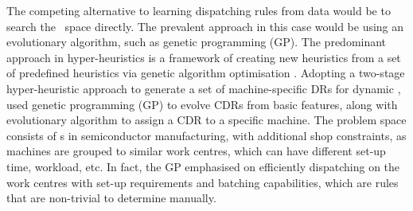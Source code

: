 \documentclass[twocolumn]{svjour3}
\begin{document}
The competing alternative to learning dispatching rules from data would be to 
search the \dr\ space directly. The prevalent approach in this case would be 
using an evolutionary algorithm, such as genetic programming (GP). 
%
The predominant approach in hyper-heuristics is a framework of creating 
new heuristics from a set of predefined heuristics via genetic algorithm 
optimisation \cite{Burke10}. 
Adopting a two-stage hyper-heuristic approach to generate a set of 
machine-specific DRs for dynamic \jsp, \cite{Pickardt2013} used genetic 
programming (GP) to evolve CDRs from basic features, along with evolutionary 
algorithm to assign a CDR to a specific machine. 
The problem space consists of \jsp s in semiconductor manufacturing, with 
additional shop constraints, as machines are grouped to similar work centres, 
which can have different set-up time, workload, etc. 
In fact, the GP emphasised on efficiently dispatching on the work centres with 
set-up requirements and batching capabilities, which are rules that are 
non-trivial to determine manually.
\end{document}
